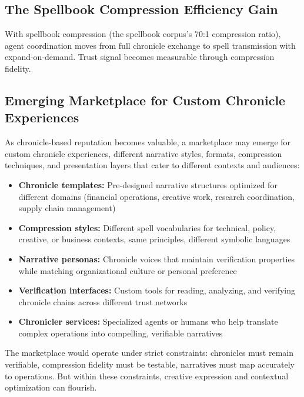 \documentclass[
]{article}
\begin{document}
\subsection{The Spellbook Compression Efficiency
Gain}\label{the-spellbook-compression-efficiency-gain}

With spellbook compression (the spellbook corpus's 70:1 compression
ratio), agent coordination moves from full chronicle exchange to spell
transmission with expand-on-demand. Trust signal becomes measurable
through compression fidelity.

\subsection{Emerging Marketplace for Custom Chronicle
Experiences}\label{emerging-marketplace-for-custom-chronicle-experiences}

As chronicle-based reputation becomes valuable, a marketplace may emerge
for custom chronicle experiences, different narrative styles, formats,
compression techniques, and presentation layers that cater to different
contexts and audiences:

\begin{itemize}
\item
  \textbf{Chronicle templates:} Pre-designed narrative structures
  optimized for different domains (financial operations, creative work,
  research coordination, supply chain management)
\item
  \textbf{Compression styles:} Different spell vocabularies for
  technical, policy, creative, or business contexts, same principles,
  different symbolic languages
\item
  \textbf{Narrative personas:} Chronicle voices that maintain
  verification properties while matching organizational culture or
  personal preference
\item
  \textbf{Verification interfaces:} Custom tools for reading, analyzing,
  and verifying chronicle chains across different trust networks
\item
  \textbf{Chronicler services:} Specialized agents or humans who help
  translate complex operations into compelling, verifiable narratives
\end{itemize}

The marketplace would operate under strict constraints: chronicles must
remain verifiable, compression fidelity must be testable, narratives
must map accurately to operations. But within these constraints,
creative expression and contextual optimization can flourish.
\end{document}
